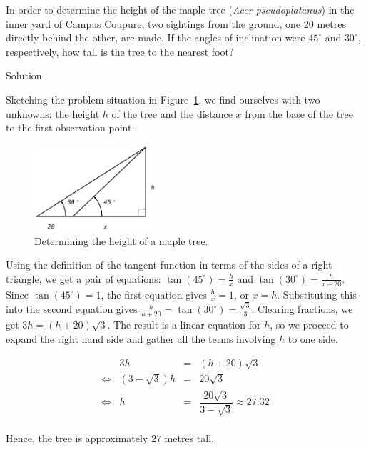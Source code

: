 \ifcourse
\begin{example}
\label{exmaple}
In order to determine the height of the maple tree (\textit{Acer pseudoplatanus}) in the inner yard of Campus Coupure, two sightings from the ground, one 20 metres directly behind the other, are made.  If the angles of inclination were $45^{\circ}$ and $30^{\circ}$, respectively, how tall is the tree to the nearest foot?

Solution 

Sketching the problem situation in Figure~\ref{fig_trans_17}, we find ourselves with two unknowns: the height $h$ of the tree and the distance $x$ from the base of the tree to the first observation point. 

\begin{figure}[H]
	\begin{center}
			\includegraphics[width=0.4\textwidth]{fig_trans_17}
	\caption{Determining the height of a maple tree. }
	\label{fig_trans_17}
	\end{center}
\end{figure}

Using the definition of the tangent function in terms of the sides of a right triangle, we get a pair of equations:  $\tan\left(45^{\circ}\right) = \frac{h}{x}$ and $\tan\left(30^{\circ}\right) = \frac{h}{x+20}$.  Since $\tan\left(45^{\circ}\right) = 1$, the first equation gives $\frac{h}{x} = 1$, or $x = h$.  Substituting this into the second equation gives $\frac{h}{h+20} = \tan\left(30^{\circ}\right) = \frac{\sqrt{3}}{3}$.  Clearing fractions,  we get $3h = (h+20) \sqrt{3}$.  The result is a linear equation for $h$, so we proceed to expand the right hand side and gather all the terms involving $h$ to one side.

\[ \begin{array}{rrcl}

&3h & = & (h+20)\sqrt{3} \\ [5pt]
\Leftrightarrow&(3-\sqrt{3}) h & = & 20 \sqrt{3} \\ [5pt]
\Leftrightarrow&h & = & \dfrac{20\sqrt{3}}{3-\sqrt{3}} \approx 27.32 \\ \end{array} \] 


Hence, the tree is approximately $27$ metres tall.

\end{example} 

